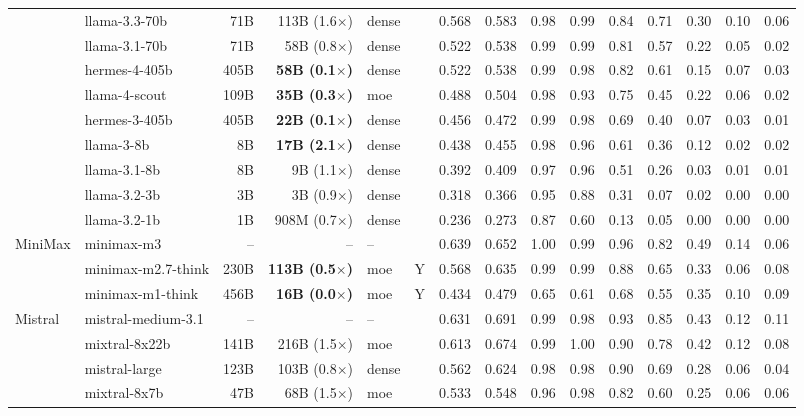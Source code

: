 \begin{longtable}{@{}ll r r l c rr rrrrrrr@{}}
 & llama-3.3-70b & 71B & 113B (1.6$\times$) & dense &  & 0.568 & 0.583 & 0.98 & 0.99 & 0.84 & 0.71 & 0.30 & 0.10 & 0.06 \\
 & llama-3.1-70b & 71B & 58B (0.8$\times$) & dense &  & 0.522 & 0.538 & 0.99 & 0.99 & 0.81 & 0.57 & 0.22 & 0.05 & 0.02 \\
 & hermes-4-405b & 405B & \textbf{58B (0.1$\times$)} & dense &  & 0.522 & 0.538 & 0.99 & 0.98 & 0.82 & 0.61 & 0.15 & 0.07 & 0.03 \\
 & llama-4-scout & 109B & \textbf{35B (0.3$\times$)} & moe &  & 0.488 & 0.504 & 0.98 & 0.93 & 0.75 & 0.45 & 0.22 & 0.06 & 0.02 \\
 & hermes-3-405b & 405B & \textbf{22B (0.1$\times$)} & dense &  & 0.456 & 0.472 & 0.99 & 0.98 & 0.69 & 0.40 & 0.07 & 0.03 & 0.01 \\
 & llama-3-8b & 8B & \textbf{17B (2.1$\times$)} & dense &  & 0.438 & 0.455 & 0.98 & 0.96 & 0.61 & 0.36 & 0.12 & 0.02 & 0.02 \\
 & llama-3.1-8b & 8B & 9B (1.1$\times$) & dense &  & 0.392 & 0.409 & 0.97 & 0.96 & 0.51 & 0.26 & 0.03 & 0.01 & 0.01 \\
 & llama-3.2-3b & 3B & 3B (0.9$\times$) & dense &  & 0.318 & 0.366 & 0.95 & 0.88 & 0.31 & 0.07 & 0.02 & 0.00 & 0.00 \\
 & llama-3.2-1b & 1B & 908M (0.7$\times$) & dense &  & 0.236 & 0.273 & 0.87 & 0.60 & 0.13 & 0.05 & 0.00 & 0.00 & 0.00 \\
MiniMax & minimax-m3 & -- & -- & -- &  & 0.639 & 0.652 & 1.00 & 0.99 & 0.96 & 0.82 & 0.49 & 0.14 & 0.06 \\
 & minimax-m2.7-think & 230B & \textbf{113B (0.5$\times$)} & moe & Y & 0.568 & 0.635 & 0.99 & 0.99 & 0.88 & 0.65 & 0.33 & 0.06 & 0.08 \\
 & minimax-m1-think & 456B & \textbf{16B (0.0$\times$)} & moe & Y & 0.434 & 0.479 & 0.65 & 0.61 & 0.68 & 0.55 & 0.35 & 0.10 & 0.09 \\
Mistral & mistral-medium-3.1 & -- & -- & -- &  & 0.631 & 0.691 & 0.99 & 0.98 & 0.93 & 0.85 & 0.43 & 0.12 & 0.11 \\
 & mixtral-8x22b & 141B & 216B (1.5$\times$) & moe &  & 0.613 & 0.674 & 0.99 & 1.00 & 0.90 & 0.78 & 0.42 & 0.12 & 0.08 \\
 & mistral-large & 123B & 103B (0.8$\times$) & dense &  & 0.562 & 0.624 & 0.98 & 0.98 & 0.90 & 0.69 & 0.28 & 0.06 & 0.04 \\
 & mixtral-8x7b & 47B & 68B (1.5$\times$) & moe &  & 0.533 & 0.548 & 0.96 & 0.98 & 0.82 & 0.60 & 0.25 & 0.06 & 0.06 \\

\end{longtable}
